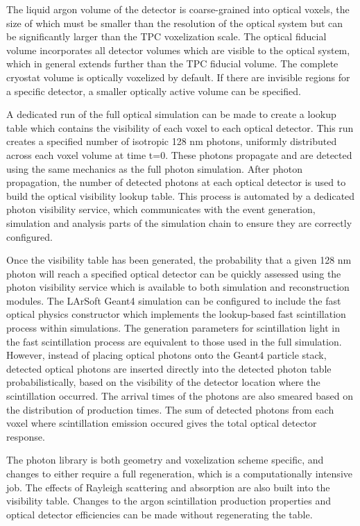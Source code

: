 \documentclass[12pt]{elsarticle}
\begin{document}
The liquid argon volume of the detector is coarse-grained into optical voxels, the size of which must be smaller than the resolution of the optical system but can be significantly larger than the TPC voxelization scale.  The optical fiducial volume incorporates all detector volumes which are visible to the optical system, which in general extends further than the TPC fiducial volume.  The complete cryostat volume is optically voxelized by default. If there are invisible regions for a specific detector, a smaller optically active volume can be specified.

A dedicated run of the full optical simulation can be made to create a lookup table which contains the visibility of each voxel to each optical detector.  This run creates a specified number of isotropic 128 nm photons, uniformly distributed across each voxel volume at time t=0.  These photons propagate and are detected using the same mechanics as the full photon simulation.  After photon propagation, the number of detected photons at each optical detector is used to build the optical visibility lookup table.  This process is automated by a dedicated photon visibility service, which communicates with the event generation, simulation and analysis parts of the simulation chain to ensure they are correctly configured.

Once the visibility table has been generated, the probability that a given 128 nm photon will reach a specified optical detector can be quickly assessed using the photon visibility service which is available to both simulation and reconstruction modules.  The LArSoft Geant4 simulation can be configured to include the fast optical physics constructor which implements the lookup-based fast scintillation process within simulations. The generation parameters for scintillation light in the fast scintillation process are equivalent to those used in the full simulation.  However, instead of placing optical photons onto the Geant4 particle stack, detected optical photons are inserted directly into the detected photon table probabilistically, based on the visibility of the detector location where the scintillation occurred.  The arrival times of the photons are also smeared based on the distribution of production times.  The sum of detected photons from each voxel where scintillation emission occured gives the total optical detector response.

The photon library is both geometry and voxelization scheme specific, and changes to either require a full regeneration, which is a computationally intensive job.  The effects of Rayleigh scattering and absorption are also built into the visibility table.  Changes to the argon scintillation production properties and optical detector efficiencies can be made without regenerating the table.
\end{document}
